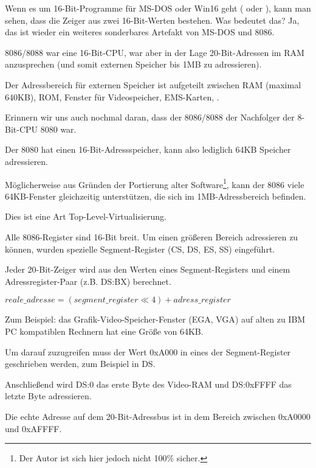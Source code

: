 \label{8086_memory_model}

Wenn es um 16-Bit-Programme für MS-DOS oder Win16 geht (
oder ), kann man sehen, dass die Zeiger aus zwei
16-Bit-Werten bestehen.
Was bedeutet das? Ja, das ist wieder ein weiteres sonderbares Artefakt von MS-DOS
und 8086.

8086/8088 war eine 16-Bit-CPU, war aber in der Lage 20-Bit-Adressen im RAM anzusprechen
(und somit externen Speicher bis 1MB zu adressieren).

Der Adressbereich für externen Speicher ist aufgeteilt zwischen \ac{RAM} (maximal 640KB),
\ac{ROM}, Fenster für Videospeicher, EMS-Karten, \etc{}.

Erinnern wir uns auch nochmal daran, dass der 8086/8088 der Nachfolger der 8-Bit-CPU
8080 war.

Der 8080 hat einen 16-Bit-Adressspeicher, kann also lediglich 64KB Speicher adressieren.

Möglicherweise aus Gründen der Portierung alter Software\footnote{Der Autor ist sich hier jedoch nicht 100\% sicher.},
kann der 8086 viele 64KB-Fenster gleichzeitig unterstützen, die sich im 1MB-Adressbereich
befinden.

Dies ist eine Art Top-Level-Virtualisierung.

Alle 8086-Register sind 16-Bit breit. Um einen größeren Bereich adressieren zu können,
wurden spezielle Segment-Register (CS, DS, ES, SS)  eingeführt.

Jeder 20-Bit-Zeiger wird aus den Werten eines Segment-Registers und einem
Adressregister-Paar (z.B. DS:BX) berechnet.

\begin{center}
$reale\_adresse = (segment\_register \ll 4) + adress\_register$
\end{center}

Zum Beispiel: das Grafik-Video-Speicher-Fenster (\ac{EGA}, \ac{VGA}) auf alten zu
IBM PC kompatiblen Rechnern hat eine Größe von 64KB.

Um darauf zuzugreifen muss der Wert 0xA000 in eines der Segment-Register geschrieben
werden, zum Beispiel in DS.

Anschließend wird DS:0 das erste Byte des Video-RAM und DS:0xFFFF das letzte
Byte adressieren.

Die echte Adresse auf dem 20-Bit-Adressbus ist in dem Bereich zwischen 0xA0000
und 0xAFFFF.

